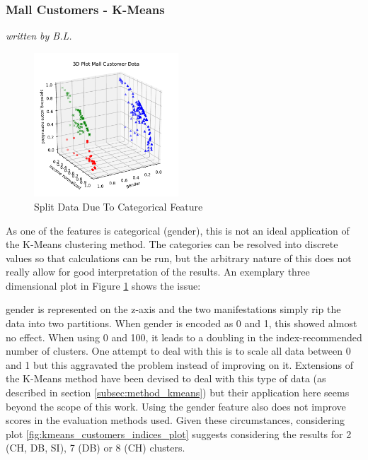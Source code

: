 \subsubsection{Mall Customers - K-Means}
\textit{written by B.L.}\\
\label{sec:mall_kmeans_evaluation}

\begin{figure}
  \centering
    \includegraphics[width=0.48\textwidth, clip]{images/kmeans_customers_3d.pdf}
  \caption{Split Data Due To {Categorical} Feature}
  \label{fig:kmeans_customers_3d}
\end{figure}

As one of the features is categorical (gender), this is not an ideal application of the K-Means clustering method. The categories can be resolved into discrete values so that calculations can be run, but the arbitrary nature of this does not really allow for good interpretation of the results. An exemplary three dimensional plot in Figure \ref{fig:kmeans_customers_3d} shows the issue: 

gender is represented on the z-axis and the two manifestations simply rip the data into two partitions. When gender is encoded as 0 and 1, this showed almost no effect. When using 0 and 100, it leads to a doubling in the index-recommended number of clusters. One attempt to deal with this is to scale all data between 0 and 1 but this aggravated the problem instead of improving on it. Extensions of the K-Means method have been devised to deal with this type of data (as described in section \ref{subsec:method_kmeans}) but their application here seems beyond the scope of this work. Using the gender feature also does not improve scores in the evaluation methods used. Given these circumstances, considering plot \ref{fig:kmeans_customers_indices_plot} suggests considering the results for 2 (\gls{CH}, \gls{DB}, \gls{SI}), 7 (\gls{DB}) or 8 (\gls{CH}) clusters.

